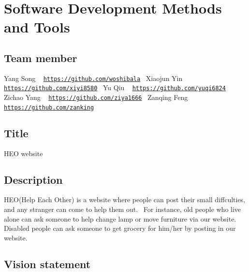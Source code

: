 \section*{Software Development Methods and Tools}

\subsection*{Team member}

Yang Song ~\newline
\href{https://github.com/woshibala}{\tt https\+://github.\+com/woshibala}~\newline
 Xiaojun Yin ~\newline
\href{https://github.com/xiyi8580}{\tt https\+://github.\+com/xiyi8580}~\newline
 Yu Qiu ~\newline
\href{https://github.com/yuqi6824}{\tt https\+://github.\+com/yuqi6824}~\newline
 Zichao Yang ~\newline
\href{https://github.com/ziya1666}{\tt https\+://github.\+com/ziya1666}~\newline
 Zanqing Feng ~\newline
\href{https://github.com/zanking}{\tt https\+://github.\+com/zanking}~\newline
~\newline
 \subsection*{Title}

H\+E\+O website ~\newline
 \subsection*{Description}

H\+E\+O(\+Help Each Other) is a website where people can post their small diffculties, and any stranger can come to help them out.~\newline
 For instance, old people who live alone can ask someone to help change lamp or move furniture via our website.~\newline
 Disabled people can ask someone to get grocery for him/her by posting in our website.~\newline
 \subsection*{Vision statement}

